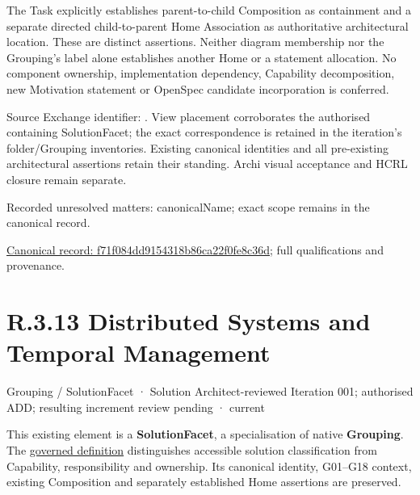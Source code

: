 The Task explicitly establishes parent-to-child Composition as containment and
a separate directed child-to-parent Home Association as authoritative architectural
location. These are distinct assertions. Neither diagram membership nor the
Grouping's label alone establishes another Home or a statement allocation.
No component ownership, implementation dependency, Capability decomposition,
new Motivation statement or OpenSpec candidate incorporation is conferred.



Source Exchange identifier: \texttt{}. View placement corroborates
the authorised containing SolutionFacet; the exact correspondence is retained in the
iteration's folder/Grouping inventories. Existing canonical identities and all
pre-existing architectural assertions retain their standing. Archi visual
acceptance and HCRL closure remain separate.


{\small Recorded unresolved matters: canonicalName; exact scope remains in the canonical record.}\par
{\footnotesize \href{../../../../../../../continuum/grouping/f71f084dd9154318b86ca22f0fe8c36d.md}{Canonical record: f71f084dd9154318b86ca22f0fe8c36d}; full qualifications and provenance.}\par
\section*{R.3.13 Distributed Systems and Temporal Management}
\label{navigation:R.3.13}

\label{element:c77bba93c0c843959b30d9e1195fb68e}
{\small Grouping / SolutionFacet · Solution Architect-reviewed Iteration 001; authorised ADD; resulting increment review pending · current}\par

This existing element is a \textbf{SolutionFacet}, a specialisation of native
\textbf{Grouping}. The \href{\detokenize{../../../../../../../governance/continuum-representation.md#solutionfacet-classification--1119-candidate}}{governed definition}
distinguishes accessible solution classification from Capability, responsibility
and ownership. Its canonical identity, G01–G18 context, existing Composition
and separately established Home assertions are preserved.



